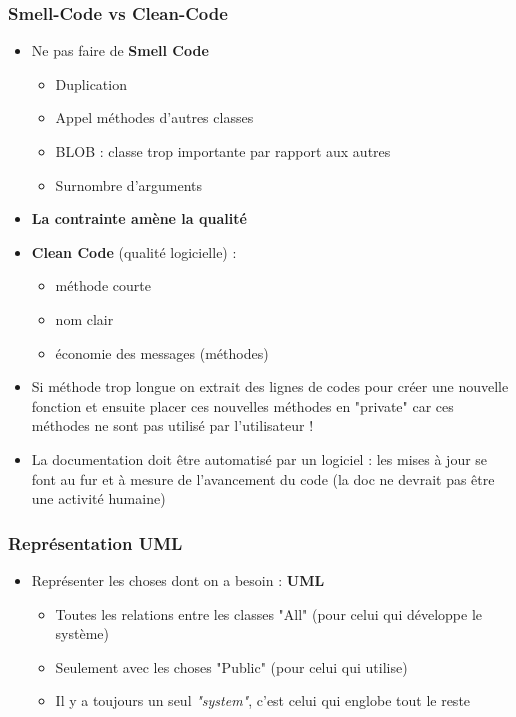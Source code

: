\documentclass[12pt,a4paper]{article}
\begin{document}
\subsubsection{Smell-Code vs Clean-Code}
\begin{itemize}
\item Ne pas faire de \textbf{Smell Code}
\begin{itemize}
\item Duplication
\item Appel méthodes d'autres classes
\item BLOB : classe trop importante par rapport aux autres
\item Surnombre d'arguments
\end{itemize}
\item \textbf{La contrainte amène la qualité}
\item \textbf{Clean Code} (qualité logicielle) :
\begin{itemize}
\item méthode courte
\item nom clair
\item économie des messages (méthodes)
\end{itemize}
\item Si méthode trop longue on extrait des lignes de codes pour créer une nouvelle fonction et ensuite placer ces nouvelles méthodes en "private" car ces méthodes ne sont pas utilisé par l'utilisateur !
\item La documentation doit être automatisé par un logiciel : les mises à jour se font au fur et à mesure de l'avancement du code (la doc ne devrait pas être une activité humaine)
\end{itemize}
\subsubsection{Représentation UML}
\begin{itemize}
\item Représenter les choses dont on a besoin : \textbf{UML}
\begin{itemize}
\item Toutes les relations entre les classes "All" (pour celui qui développe le système)
\item Seulement avec les choses "Public" (pour celui qui utilise)
\item Il y a toujours un seul \textit{"system"}, c'est celui qui englobe tout le reste
\end{itemize}
\end{itemize}
\end{document}
